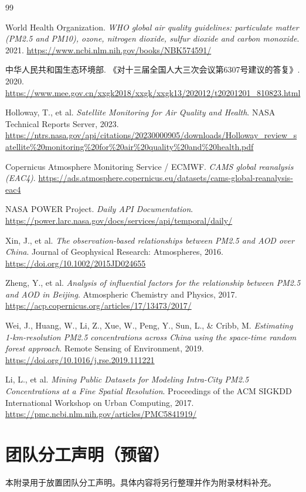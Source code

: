 \documentclass[UTF8,zihao=-4,a4paper]{ctexart}
\begin{document}
\begin{thebibliography}{99}

World Health Organization. \textit{WHO global air quality guidelines: particulate matter (PM2.5 and PM10), ozone, nitrogen dioxide, sulfur dioxide and carbon monoxide}. 2021. \url{https://www.ncbi.nlm.nih.gov/books/NBK574591/}

中华人民共和国生态环境部. 《对十三届全国人大三次会议第6307号建议的答复》. 2020. \url{https://www.mee.gov.cn/xxgk2018/xxgk/xxgk13/202012/t20201201_810823.html}

Holloway, T., et al. \textit{Satellite Monitoring for Air Quality and Health}. NASA Technical Reports Server, 2023. \url{https://ntrs.nasa.gov/api/citations/20230000905/downloads/Holloway_review_satellite%20monitoring%20for%20air%20quality%20and%20health.pdf}

Copernicus Atmosphere Monitoring Service / ECMWF. \textit{CAMS global reanalysis (EAC4)}. \url{https://ads.atmosphere.copernicus.eu/datasets/cams-global-reanalysis-eac4}

NASA POWER Project. \textit{Daily API Documentation}. \url{https://power.larc.nasa.gov/docs/services/api/temporal/daily/}

Xin, J., et al. \textit{The observation-based relationships between PM2.5 and AOD over China}. Journal of Geophysical Research: Atmospheres, 2016. \url{https://doi.org/10.1002/2015JD024655}

Zheng, Y., et al. \textit{Analysis of influential factors for the relationship between PM2.5 and AOD in Beijing}. Atmospheric Chemistry and Physics, 2017. \url{https://acp.copernicus.org/articles/17/13473/2017/}

Wei, J., Huang, W., Li, Z., Xue, W., Peng, Y., Sun, L., \& Cribb, M. \textit{Estimating 1-km-resolution PM2.5 concentrations across China using the space-time random forest approach}. Remote Sensing of Environment, 2019. \url{https://doi.org/10.1016/j.rse.2019.111221}

Li, L., et al. \textit{Mining Public Datasets for Modeling Intra-City PM2.5 Concentrations at a Fine Spatial Resolution}. Proceedings of the ACM SIGKDD International Workshop on Urban Computing, 2017. \url{https://pmc.ncbi.nlm.nih.gov/articles/PMC5841919/}

\end{thebibliography}

\appendix
\section{团队分工声明（预留）}

本附录用于放置团队分工声明。具体内容将另行整理并作为附录材料补充。
\end{document}
